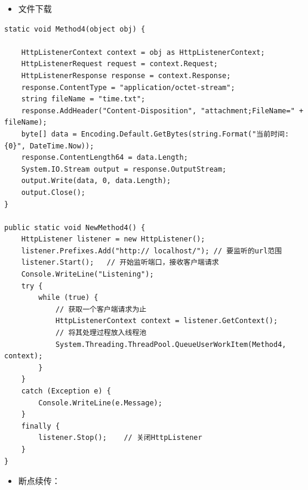 \documentclass[9pt, b5paper]{article}
\begin{document}
\begin{itemize}
\item 文件下载
\end{itemize}
\begin{verbatim}
static void Method4(object obj) {

    HttpListenerContext context = obj as HttpListenerContext;
    HttpListenerRequest request = context.Request;
    HttpListenerResponse response = context.Response;
    response.ContentType = "application/octet-stream";
    string fileName = "time.txt";
    response.AddHeader("Content-Disposition", "attachment;FileName=" + fileName);
    byte[] data = Encoding.Default.GetBytes(string.Format("当前时间: {0}", DateTime.Now));
    response.ContentLength64 = data.Length;
    System.IO.Stream output = response.OutputStream;
    output.Write(data, 0, data.Length);
    output.Close();
}

public static void NewMethod4() {
    HttpListener listener = new HttpListener();
    listener.Prefixes.Add("http:// localhost/"); // 要监听的url范围
    listener.Start();   // 开始监听端口，接收客户端请求
    Console.WriteLine("Listening");
    try {
        while (true) {
            // 获取一个客户端请求为止
            HttpListenerContext context = listener.GetContext();
            // 将其处理过程放入线程池
            System.Threading.ThreadPool.QueueUserWorkItem(Method4, context);
        }
    }
    catch (Exception e) {
        Console.WriteLine(e.Message);
    }
    finally {
        listener.Stop();    // 关闭HttpListener
    }
}
\end{verbatim}
\begin{itemize}
\item 断点续传：
\end{itemize}
\end{document}
